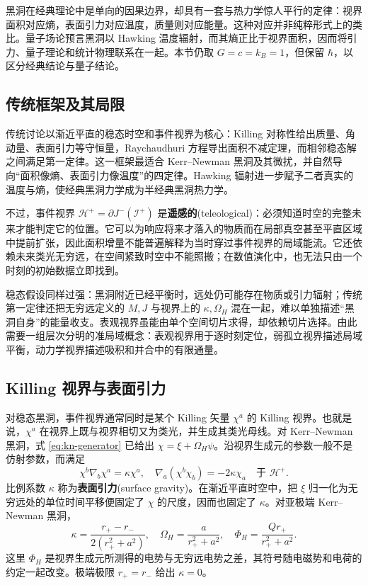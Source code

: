 黑洞在经典理论中是单向的因果边界，却具有一套与热力学惊人平行的定律：视界面积对应熵，表面引力对应温度，质量则对应能量。这种对应并非纯粹形式上的类比。量子场论预言黑洞以 Hawking 温度辐射，而其熵正比于视界面积，因而将引力、量子理论和统计物理联系在一起。本节仍取 $G=c=k_B=1$，但保留 $\hbar$，以区分经典结论与量子结论。

\subsection{传统框架及其局限}

传统讨论以渐近平直的稳态时空和事件视界为核心：Killing 对称性给出质量、角动量、表面引力等守恒量，Raychaudhuri 方程导出面积不减定理，而相邻稳态解之间满足第一定律。这一框架最适合 Kerr--Newman 黑洞及其微扰，并自然导向“面积像熵、表面引力像温度”的四定律。Hawking 辐射进一步赋予二者真实的温度与熵，使经典黑洞力学成为半经典黑洞热力学。

不过，事件视界 $\mathcal H^+=\partial J^-(\mathscr I^+)$ 是\textbf{遥感的}(teleological)：必须知道时空的完整未来才能判定它的位置。它可以为响应将来才落入的物质而在局部真空甚至平直区域中提前扩张，因此面积增量不能普遍解释为当时穿过事件视界的局域能流。它还依赖未来类光无穷远，在空间紧致时空中不能照搬；在数值演化中，也无法只由一个时刻的初始数据立即找到。

稳态假设同样过强：黑洞附近已经平衡时，远处仍可能存在物质或引力辐射；传统第一定律还把无穷远定义的 $M,J$ 与视界上的 $\kappa,\Omega_H$ 混在一起，难以单独描述“黑洞自身”的能量收支。表观视界虽能由单个空间切片求得，却依赖切片选择。由此需要一组层次分明的准局域概念：表观视界用于逐时刻定位，弱孤立视界描述局域平衡，动力学视界描述吸积和并合中的有限通量。

\subsection{Killing 视界与表面引力}

对稳态黑洞，事件视界通常同时是某个 Killing 矢量 $\chi^a$ 的 Killing 视界。也就是说，$\chi^a$ 在视界上既与视界相切又为类光，并生成其类光母线。对 Kerr--Newman 黑洞，式 \eqref{eq:kn-generator} 已给出 $\chi=\xi+\Omega_H\psi$。沿视界生成元的参数一般不是仿射参数，而满足
\begin{equation}
    \chi^b\nabla_b\chi^a=\kappa\chi^a,
    \quad
    \nabla_a(\chi^b\chi_b)=-2\kappa\chi_a
    \quad\text{于 }\mathcal H^+ .
\end{equation}
比例系数 $\kappa$ 称为\textbf{表面引力}(surface gravity)。在渐近平直时空中，把 $\xi$ 归一化为无穷远处的单位时间平移便固定了 $\chi$ 的尺度，因而也固定了 $\kappa$。对亚极端 Kerr--Newman 黑洞，
\begin{equation}
    \kappa=\frac{r_+-r_-}{2(r_+^2+a^2)},\quad
    \Omega_H=\frac{a}{r_+^2+a^2},\quad
    \Phi_H=\frac{Qr_+}{r_+^2+a^2}.
\end{equation}
这里 $\Phi_H$ 是视界生成元所测得的电势与无穷远电势之差，其符号随电磁势和电荷的约定一起改变。极端极限 $r_+=r_-$ 给出 $\kappa=0$。

